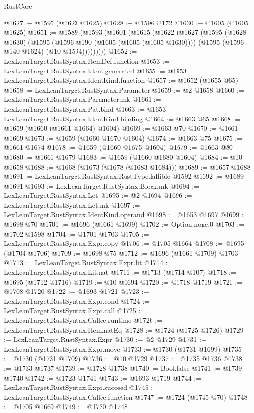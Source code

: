 \begin{lexlean}{RustCore}
\begin{coremodule}
@1627 := @1595 (@1623 @1625)
@1628 := @1596 @172
@1630 := @1605 (@1605 @1625)
@1651 := @1589
    (@1593
      (@1601
        (@1615
          (@1622
            (@1627
              (@1595
                (@1628 @1630)
                (@1595
                  (@1596 @190 (@1605 (@1605 (@1605 @1630))))
                  (@1595 (@1596 @140 @1624) (@10 @1594)))))))))
@1652 := LexLeanTarget.RustSyntax.ItemDef.function
@1653 := LexLeanTarget.RustSyntax.Ident.generated
@1655 := @1653 LexLeanTarget.RustSyntax.IdentKind.function
@1657 := @1652 (@1655 @65)
@1658 := LexLeanTarget.RustSyntax.Parameter
@1659 := @2 @1658
@1660 := LexLeanTarget.RustSyntax.Parameter.mk
@1661 := LexLeanTarget.RustSyntax.Pat.bind
@1663 := @1653 LexLeanTarget.RustSyntax.IdentKind.binding
@1664 := @1663 @65
@1668 := @1659 (@1660 (@1661 @1664) @1604)
@1669 := @1663 @70
@1670 := @1661 @1669
@1673 := @1659 (@1660 @1670 @1604)
@1674 := @1663 @75
@1675 := @1661 @1674
@1678 := @1659 (@1660 @1675 @1604)
@1679 := @1663 @80
@1680 := @1661 @1679
@1683 := @1659 (@1660 @1680 @1604)
@1684 := @10 @1658
@1688 := @1668 (@1673 (@1678 (@1683 @1684)))
@1689 := @1657 @1688
@1691 := LexLeanTarget.RustSyntax.RustType.fallible @1592
@1692 := @1689 @1691
@1693 := LexLeanTarget.RustSyntax.Block.mk
@1694 := LexLeanTarget.RustSyntax.Let
@1695 := @2 @1694
@1696 := LexLeanTarget.RustSyntax.Let.mk
@1697 := LexLeanTarget.RustSyntax.IdentKind.operand
@1698 := @1653 @1697
@1699 := @1698 @70
@1701 := @1696 (@1661 @1699)
@1702 := Option.none.{0}
@1703 := @1702 @1598
@1704 := @1701 @1703
@1705 := LexLeanTarget.RustSyntax.Expr.copy
@1706 := @1705 @1664
@1708 := @1695 (@1704 @1706)
@1709 := @1698 @75
@1712 := @1696 (@1661 @1709) @1703
@1713 := LexLeanTarget.RustSyntax.Expr.lit
@1714 := LexLeanTarget.RustSyntax.Lit.nat
@1716 := @1713 (@1714 @107)
@1718 := @1695 (@1712 @1716)
@1719 := @10 @1694
@1720 := @1718 @1719
@1721 := @1708 @1720
@1722 := @1693 @1721
@1723 := LexLeanTarget.RustSyntax.Expr.cond
@1724 := LexLeanTarget.RustSyntax.Expr.call
@1725 := LexLeanTarget.RustSyntax.Callee.runtime
@1726 := LexLeanTarget.RustSyntax.Item.natEq
@1728 := @1724 (@1725 @1726)
@1729 := LexLeanTarget.RustSyntax.Expr
@1730 := @2 @1729
@1731 := LexLeanTarget.RustSyntax.Expr.move
@1733 := @1730 (@1731 @1699)
@1735 := @1730 (@1731 @1709)
@1736 := @10 @1729
@1737 := @1735 @1736
@1738 := @1733 @1737
@1739 := @1728 @1738
@1740 := Bool.false
@1741 := @1739 @1740
@1742 := @1723 @1741
@1743 := @1693 @1719
@1744 := LexLeanTarget.RustSyntax.Expr.succeed
@1745 := LexLeanTarget.RustSyntax.Callee.function
@1747 := @1724 (@1745 @70)
@1748 := @1705 @1669
@1749 := @1730 @1748

\end{coremodule}
\end{lexlean}
